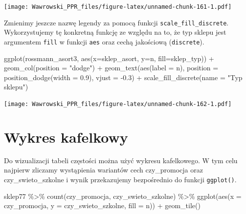 \documentclass[
]{book}
\newenvironment{Shaded}{\begin{snugshade}}{\end{snugshade}}
\newcommand{\AttributeTok}[1]{\textcolor[rgb]{0.77,0.63,0.00}{#1}}
\newcommand{\FloatTok}[1]{\textcolor[rgb]{0.00,0.00,0.81}{#1}}
\newcommand{\FunctionTok}[1]{\textcolor[rgb]{0.00,0.00,0.00}{#1}}
\newcommand{\NormalTok}[1]{#1}
\newcommand{\SpecialCharTok}[1]{\textcolor[rgb]{0.00,0.00,0.00}{#1}}
\newcommand{\StringTok}[1]{\textcolor[rgb]{0.31,0.60,0.02}{#1}}
\begin{document}
\texttt{[image: Wawrowski\_PPR\_files/figure-latex/unnamed-chunk-161-1.pdf]}

Zmienimy jeszcze nazwę legendy za pomocą funkcji \texttt{scale\_fill\_discrete}. Wykorzystujemy tę konkretną funkcję ze względu na to, że typ sklepu jest argumentem \texttt{fill} w funkcji \texttt{aes} oraz cechą jakościową (\texttt{discrete}).

\begin{Shaded}
\begin{Highlighting}[]
\FunctionTok{ggplot}\NormalTok{(rossmann\_asort3, }\FunctionTok{aes}\NormalTok{(}\AttributeTok{x=}\NormalTok{sklep\_asort, }\AttributeTok{y=}\NormalTok{n, }\AttributeTok{fill=}\NormalTok{sklep\_typ)) }\SpecialCharTok{+}
  \FunctionTok{geom\_col}\NormalTok{(}\AttributeTok{position =} \StringTok{"dodge"}\NormalTok{) }\SpecialCharTok{+} 
  \FunctionTok{geom\_text}\NormalTok{(}\FunctionTok{aes}\NormalTok{(}\AttributeTok{label =}\NormalTok{ n), }
            \AttributeTok{position =} \FunctionTok{position\_dodge}\NormalTok{(}\AttributeTok{width =} \FloatTok{0.9}\NormalTok{),}
            \AttributeTok{vjust =} \SpecialCharTok{{-}}\FloatTok{0.3}\NormalTok{) }\SpecialCharTok{+}
  \FunctionTok{scale\_fill\_discrete}\NormalTok{(}\AttributeTok{name =} \StringTok{"Typ sklepu"}\NormalTok{)}
\end{Highlighting}
\end{Shaded}

\texttt{[image: Wawrowski\_PPR\_files/figure-latex/unnamed-chunk-162-1.pdf]}

\hypertarget{wykres-kafelkowy}{%
\section{Wykres kafelkowy}\label{wykres-kafelkowy}}

Do wizualizacji tabeli częstości można użyć wykresu kafelkowego. W tym celu najpierw zliczamy wystąpienia wariantów cech czy\_promocja oraz czy\_swieto\_szkolne i wynik przekazujemy bezpośrednio do funkcji \texttt{ggplot()}.

\begin{Shaded}
\begin{Highlighting}[]
\NormalTok{sklep77 }\SpecialCharTok{\%\textgreater{}\%}
  \FunctionTok{count}\NormalTok{(czy\_promocja, czy\_swieto\_szkolne) }\SpecialCharTok{\%\textgreater{}\%}
  \FunctionTok{ggplot}\NormalTok{(}\FunctionTok{aes}\NormalTok{(}\AttributeTok{x =}\NormalTok{ czy\_promocja, }
             \AttributeTok{y =}\NormalTok{ czy\_swieto\_szkolne,}
             \AttributeTok{fill =}\NormalTok{ n)) }\SpecialCharTok{+}
  \FunctionTok{geom\_tile}\NormalTok{()}
\end{Highlighting}
\end{Shaded}
\end{document}
